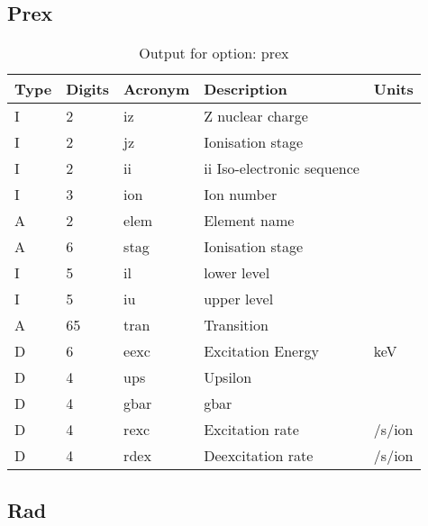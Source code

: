 \subsection{Prex}

\begin{table}[!p]
\caption{Output for option: prex}
\label{tabout:prex}
\begin{tabular}{lllll}
\hline
Type & Digits & Acronym & Description & Units \\ 
\hline
I &  2 & iz   & Z nuclear charge                 &                  \\
I &  2 & jz   & Ionisation stage                 &                  \\
I &  2 & ii   & ii Iso-electronic sequence       &                  \\
I &  3 & ion  & Ion number                       &                  \\
A &  2 & elem & Element name                     &                  \\
A &  6 & stag & Ionisation stage                 &                  \\
I &  5 & il   & lower level                      &                  \\
I &  5 & iu   & upper level                      &                  \\
A & 65 & tran & Transition                       &                  \\
D &  6 & eexc & Excitation Energy                & keV              \\
D &  4 & ups  & Upsilon                          &                  \\
D &  4 & gbar & gbar                             &                  \\
D &  4 & rexc & Excitation rate                  & /s/ion           \\
D &  4 & rdex & Deexcitation rate                & /s/ion           \\
\hline
\end{tabular}
\end{table}

\subsection{Rad}

